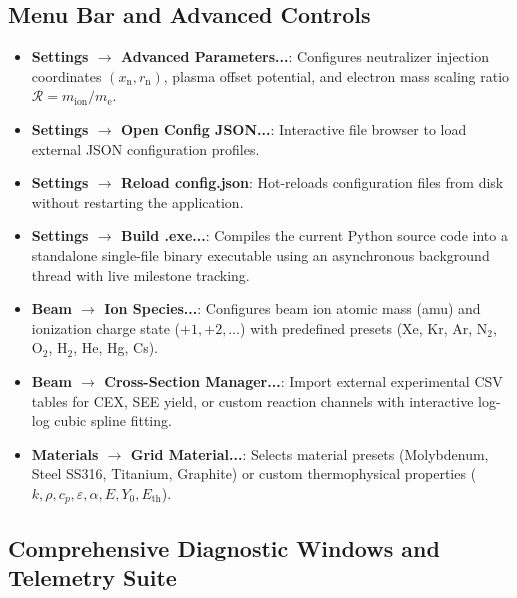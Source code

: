 \documentclass[11pt,a4paper]{article}
\begin{document}
\subsection{Menu Bar and Advanced Controls}

\begin{itemize}
    \item \textbf{Settings $\rightarrow$ Advanced Parameters...}: Configures neutralizer injection coordinates $(x_{\mathrm{n}}, r_{\mathrm{n}})$, plasma offset potential, and electron mass scaling ratio $\mathcal{R} = m_{\mathrm{ion}}/m_{\mathrm{e}}$.
    \item \textbf{Settings $\rightarrow$ Open Config JSON...}: Interactive file browser to load external JSON configuration profiles.
    \item \textbf{Settings $\rightarrow$ Reload config.json}: Hot-reloads configuration files from disk without restarting the application.
    \item \textbf{Settings $\rightarrow$ Build .exe...}: Compiles the current Python source code into a standalone single-file binary executable using an asynchronous background thread with live milestone tracking.
    \item \textbf{Beam $\rightarrow$ Ion Species...}: Configures beam ion atomic mass (amu) and ionization charge state ($+1, +2, \dots$) with predefined presets (Xe, Kr, Ar, N$_2$, O$_2$, H$_2$, He, Hg, Cs).
    \item \textbf{Beam $\rightarrow$ Cross-Section Manager...}: Import external experimental CSV tables for CEX, SEE yield, or custom reaction channels with interactive log-log cubic spline fitting.
    \item \textbf{Materials $\rightarrow$ Grid Material...}: Selects material presets (Molybdenum, Steel SS316, Titanium, Graphite) or custom thermophysical properties ($k, \rho, c_p, \varepsilon, \alpha, E, Y_0, E_{\mathrm{th}}$).
\end{itemize}

\subsection{Comprehensive Diagnostic Windows and Telemetry Suite}
\end{document}
